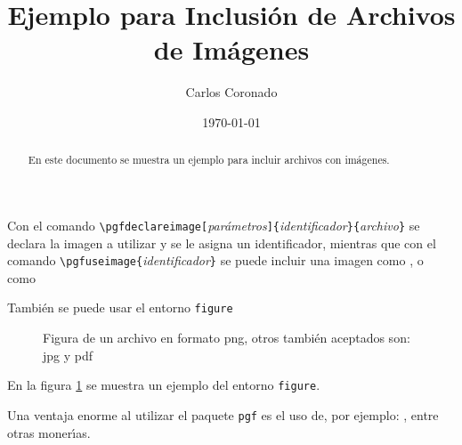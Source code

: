 \documentclass{article}            %
\author{Carlos Coronado}
\title{Ejemplo para Inclusi\'on de Archivos de Im\'agenes}
\date{\today}
\begin{document}

\maketitle                         %

\begin{abstract}                   %

  En este documento se muestra un ejemplo para incluir archivos con
  im\'agenes.

\end{abstract}


  Con el comando
  \verb|\pgfdeclareimage[|\textit{par\'ametros}\verb|]{|\textit{identificador}\verb|}|\verb|{|\textit{archivo}\verb|}|
  se declara la imagen a utilizar y se le asigna un identificador,
  mientras que con el comando
  \verb|\pgfuseimage{|\textit{identificador}\verb|}| se puede incluir
  una imagen como , o como

  \begin{center}
  \end{center}

  Tambi\'en se puede usar el entorno \texttt{figure}

\begin{figure}
  \begin{center}

    \caption{Figura de un archivo en formato png, otros tambi\'en
    aceptados son: jpg y pdf}\label{miFIG}

  \end{center}
\end{figure}

En la figura \ref{miFIG} se muestra un ejemplo del entorno
\texttt{figure}.


Una ventaja enorme al utilizar el paquete \texttt{pgf} es el uso de,
por ejemplo: , entre otras moner\'{\i}as.
\end{document}
